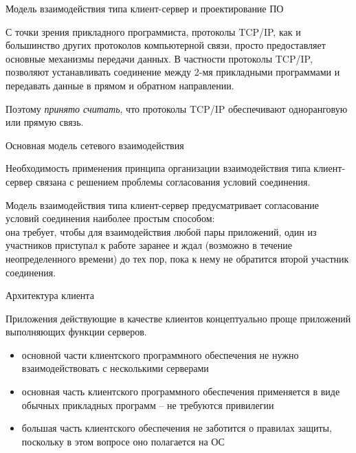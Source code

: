 \begin{frame}{Модель взаимодействия типа клиент-сервер и проектирование ПО}

С точки зрения прикладного программиста,  протоколы TCP/IP,  как и большинство других протоколов
компьютерной связи,  просто предоставляет основные механизмы передачи данных. 
В частности протоколы  TCP/IP,  позволяют устанавливать соединение между 2-мя прикладными программами 
и передавать данные в прямом и обратном направлении. 

Поэтому {\itshape принято считать}, что протоколы  TCP/IP обеспечивают одноранговую или прямую связь.
\end{frame}

\begin{frame}{Основная модель сетевого взаимодействия}

Необходимость применения принципа организации взаимодействия типа клиент-сервер связана с решением проблемы согласования условий соединения.

Модель взаимодействия типа клиент-сервер предусматривает согласование условий соединения наиболее простым способом:\\ 
\bigskip
она требует,  чтобы для взаимодействия любой пары приложений,  один из участников приступал к работе заранее и ждал (возможно в течение неопределенного времени) до тех пор,  пока к нему не обратится второй участник соединения.
\end{frame}

\begin{frame}{}

	\begin{center}
		{\Huge Архитектура клиента}
	\end{center}
\end{frame}

\begin{frame}{}

	Приложения действующие в качестве клиентов концептуально проще приложений выполняющих функции серверов.
	\begin{itemize}
		\item основной части клиентского программного обеспечения не нужно взаимодействовать с несколькими серверами
			\pause
		\item основная часть клиентского программного обеспечения применяется в виде обычных прикладных программ -- не требуются привилегии
			\pause
		\item большая часть клиентского обеспечения не заботится о правилах защиты,  поскольку в этом вопросе оно полагается на ОС
	\end{itemize}

\end{frame}

